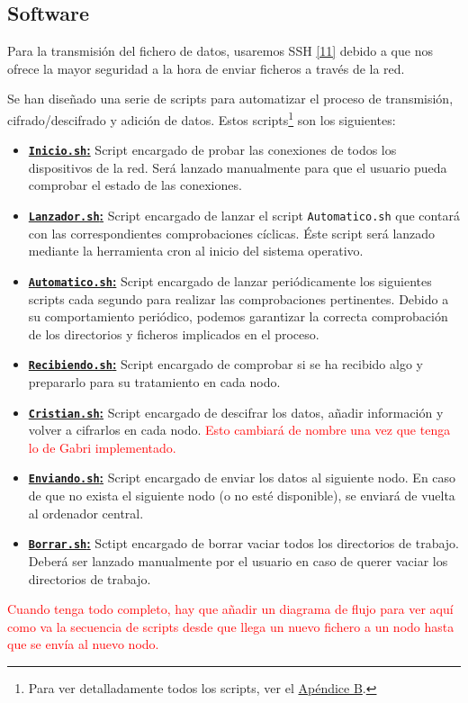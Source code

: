 \subsection{Software}
Para la transmisión del fichero de datos, usaremos SSH \hyperlink{11}{[11]} debido a que nos ofrece la mayor seguridad a la hora de enviar ficheros a través de la red.

Se han diseñado una serie de scripts para automatizar el proceso de transmisión, cifrado/descifrado y adición de datos. Estos scripts\footnote{Para ver detalladamente todos los scripts, ver el \hyperlink{Scripts}{Apéndice B}.} son los siguientes:
\begin{itemize}
	\item \hyperlink{ScriptConexion}{\textbf{\texttt{Inicio.sh}:}} Script encargado de probar las conexiones de todos los dispositivos de la red. Será lanzado manualmente para que el usuario pueda comprobar el estado de las conexiones.
	\item \hyperlink{ScriptLanzador}{\textbf{\texttt{Lanzador.sh}:}} Script encargado de lanzar el script \texttt{Automatico.sh} que contará con las correspondientes comprobaciones cíclicas. Éste script será lanzado mediante la herramienta cron al inicio del sistema operativo.
	\item \hyperlink{ScriptAutomatico}{\textbf{\texttt{Automatico.sh}:}} Script encargado de lanzar periódicamente los siguientes scripts cada segundo para realizar las comprobaciones pertinentes. Debido a su comportamiento periódico, podemos garantizar la correcta comprobación de los directorios y ficheros implicados en el proceso.
	\item \hyperlink{ScriptRecibiendo}{\textbf{\texttt{Recibiendo.sh}:}} Script encargado de comprobar si se ha recibido algo y prepararlo para su tratamiento en cada nodo.
	\item \hyperlink{ScriptCristian}{\textbf{\texttt{Cristian.sh}:}} Script encargado de descifrar los datos, añadir información y volver a cifrarlos en cada nodo. \textcolor{red}{Esto cambiará de nombre una vez que tenga lo de Gabri implementado.}
	\item \hyperlink{ScriptEnviando}{\textbf{\texttt{Enviando.sh}:}} Script encargado de enviar los datos al siguiente nodo. En caso de que no exista el siguiente nodo (o no esté disponible), se enviará de vuelta al ordenador central.
	\item \hyperlink{ScriptBorrar}{\textbf{\texttt{Borrar.sh}:}} Sctipt encargado de borrar vaciar todos los directorios de trabajo. Deberá ser lanzado manualmente por el usuario en caso de querer vaciar los directorios de trabajo.
\end{itemize}

\textcolor{red}{Cuando tenga todo completo, hay que añadir un diagrama de flujo para ver aquí como va la secuencia de scripts desde que llega un nuevo fichero a un nodo hasta que se envía al nuevo nodo.}